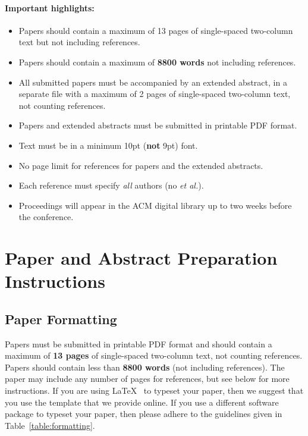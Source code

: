 \documentclass[pageno]{jpaper}
\begin{document}
\paragraph{Important highlights:}
\begin{itemize}
\item Papers should contain a
maximum of 13 pages of single-spaced two-column text but not including
references.
\item Papers should contain a maximum of {\bf 8800 words} not including references.
\item All submitted papers must be accompanied by an extended
  abstract, in a separate file with a maximum of 
2 pages of single-spaced two-column text, not counting references.
\item Papers and extended abstracts must be submitted in printable PDF format.
\item Text must be in a minimum 10pt ({\bf not} 9pt) font.
\item No page limit for references for papers and the extended abstracts.
\item Each reference must specify {\em all} authors (no {\em et al.}).
\item Proceedings will appear in the ACM digital library up to two weeks
before the conference.
\end{itemize}

\section{Paper and Abstract Preparation Instructions}

\subsection{Paper Formatting}

Papers must be submitted in printable PDF format and should contain a
maximum of {\bf 13 pages} of single-spaced two-column text, not counting
references. Papers should contain less than {\bf 8800 words} (not including references). The paper may include any number of pages for
references, but see below for more instructions. If you are using
\LaTeX~\cite{lamport94} to typeset your paper, then we suggest that
you use the template that we provide online.
If you use a different
software package to typeset your paper, then please adhere to the
guidelines given in Table~\ref{table:formatting}.
\end{document}
